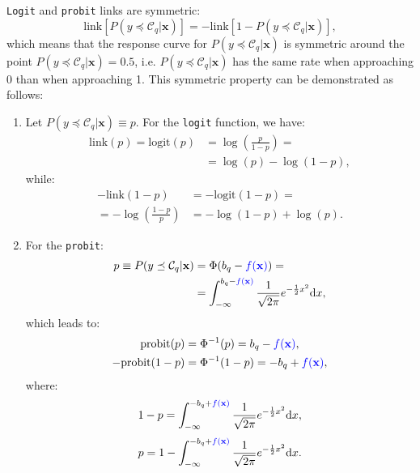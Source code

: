 \documentclass[journal]{IEEEtran}
\begin{document}
	\texttt{Logit} and \texttt{probit} links are symmetric:	
	\begin{equation}
	\text{link}[P(y \preceq \mathcal{C}_q | \mathbf{x})] = -\text{link}[1 - P(y \preceq \mathcal{C}_q | \mathbf{x})],
	\end{equation}
	which means that the response curve for $P(y \preceq \mathcal{C}_q | \mathbf{x})$ is symmetric around the point $P(y \preceq \mathcal{C}_q | \mathbf{x}) = 0.5$, i.e. $P(y \preceq \mathcal{C}_q | \mathbf{x})$ has the same rate when approaching 0 than when approaching 1. This symmetric property can be demonstrated as follows:	
	\begin{enumerate}
		\item Let $P(y \preceq \mathcal{C}_q | \mathbf{x}) \equiv p$. For the \texttt{logit} function, we have:
		\begin{equation}
		\begin{aligned}
		\text{link}(p) = \text{logit}(p) &= \log\left(\frac{p}{1-p}\right) =\\
		&= \log(p) - \log(1-p),
		\end{aligned}
		\end{equation}			
		while:			
		\begin{equation}
		\begin{aligned}
		-\text{link}(1 - p) &= -\text{logit}(1 - p) =\\
		=- \log\left(\frac{1- p}{p}\right) &= - \log(1 - p) + \log(p).
		\end{aligned}
		\end{equation}
		
		\item For the \texttt{probit}:		
		\begin{equation}
		\begin{aligned}
		p \equiv P(y \preceq \mathcal{C}_q | \mathbf{x}) &= \Phi(b_q - \textcolor{blue}{f(\mathbf{x})}) =\\
		&= \int_{-\infty}^{b_q - \textcolor{blue}{f(\mathbf{x})}} \frac{1}{\sqrt{2\pi}} e^{-\frac{1}{2}x^2} \mathrm{d}x,
		\end{aligned}
		\end{equation}
		which leads to:
		\begin{align}
		\text{probit}(p) & = \Phi^{-1}(p) = b_q - \textcolor{blue}{f(\mathbf{x})},\\
		-\text{probit}(1-p) &= \Phi^{-1}(1-p) = -b_q + \textcolor{blue}{f(\mathbf{x})},
		\end{align}
		where:		
		\begin{equation}
		1 - p = \int_{-\infty}^{-b_q + \textcolor{blue}{f(\mathbf{x})}} \frac{1}{\sqrt{2\pi}} e^{-\frac{1}{2}x^2} \mathrm{d}x,
		\end{equation}
		\begin{equation}
		p = 1 - \int_{-\infty}^{-b_q + \textcolor{blue}{f(\mathbf{x})}} \frac{1}{\sqrt{2\pi}} e^{-\frac{1}{2}x^2} \mathrm{d}x.
		\end{equation}
	\end{enumerate}
	
\end{document}
